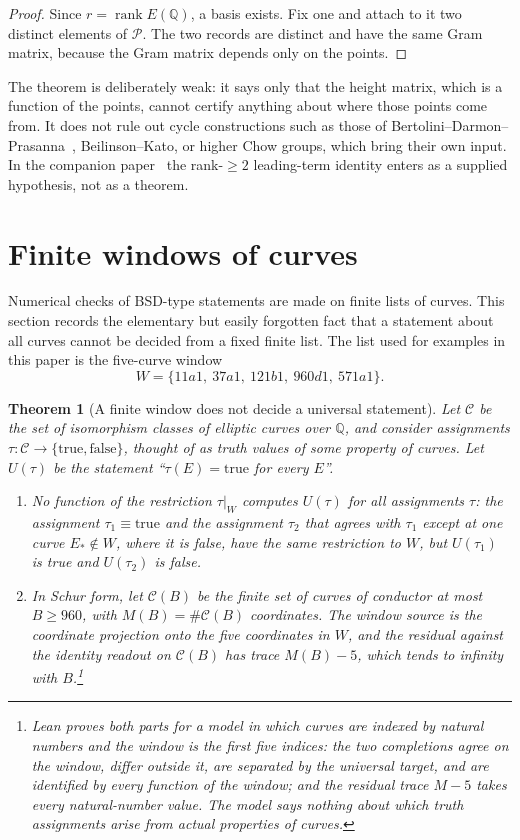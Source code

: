 \documentclass[11pt]{article}
\newtheorem{theorem}{Theorem}[section]
\theoremstyle{definition}
\newcommand{\Q}{\mathbb{Q}}
\newcommand{\rank}{\operatorname{rank}}
\begin{document}
\begin{proof}
Since $r=\rank E(\Q)$, a basis exists.  Fix one and attach to it two
distinct elements of $\mathcal P$.  The two records are distinct and have
the same Gram matrix, because the Gram matrix depends only on the
points.
\end{proof}

The theorem is deliberately weak: it says only that the height matrix,
which is a function of the points, cannot certify anything about where
those points come from.  It does not rule out cycle constructions such as
those of Bertolini--Darmon--Prasanna~\citep{BertoliniDarmonPrasanna2013},
Beilinson--Kato, or higher Chow groups, which bring their own input.  In
the companion paper~\citep{TsiokosBSDClosure2026} the rank-$\ge2$
leading-term identity enters as a supplied hypothesis, not as a theorem.
 \section{Finite windows of curves}
\label{sec:global-audit-no-go}

Numerical checks of BSD-type statements are made on finite lists of
curves.  This section records the elementary but easily forgotten fact
that a statement about all curves cannot be decided from a fixed finite
list.  The list used for examples in this paper is the five-curve window
\[
  W=\{11a1,\ 37a1,\ 121b1,\ 960d1,\ 571a1\}.
\]

\begin{theorem}[A finite window does not decide a universal statement]\label{thm:apparatus:finite-window-no-go}
Let $\mathcal C$ be the set of isomorphism classes of elliptic curves over
$\Q$, and consider assignments $\tau:\mathcal C\to\{\mathrm{true},
\mathrm{false}\}$, thought of as truth values of some property of curves.
Let $U(\tau)$ be the statement ``$\tau(E)=\mathrm{true}$ for every $E$''.
\begin{enumerate}
\item No function of the restriction $\tau|_W$ computes $U(\tau)$ for all
  assignments $\tau$: the assignment $\tau_1\equiv\mathrm{true}$ and the
  assignment $\tau_2$ that agrees with $\tau_1$ except at one curve
  $E_*\notin W$, where it is false, have the same restriction to $W$, but
  $U(\tau_1)$ is true and $U(\tau_2)$ is false.
\item In Schur form, let $\mathcal C(B)$ be the finite set of curves of
  conductor at most $B\ge960$, with $M(B)=\#\mathcal C(B)$ coordinates.
  The window source is the coordinate projection onto the five
  coordinates in $W$, and the residual against the identity readout on
  $\mathcal C(B)$ has trace $M(B)-5$, which tends to infinity with $B$.\footnote{Lean proves both parts for a model in which curves are indexed
by natural numbers and the window is the first five indices: the two
completions agree on the window, differ outside it, are separated by the
universal target, and are identified by every function of the window;
and the residual trace $M-5$ takes every natural-number value.  The model
says nothing about which truth assignments arise from actual properties
of curves.}
\end{enumerate}
\end{theorem}
\end{document}
